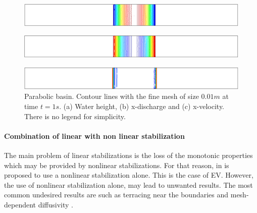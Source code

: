 \begin{figure}[H]
    \begin{subfigure}{.05\textwidth}
        \caption{}
    \end{subfigure}
    \begin{minipage}[c]{.94\textwidth}
        \includegraphics[width=\textwidth]{img/eulerian/par/height.png}
    \end{minipage}
\par\medskip
    \begin{subfigure}{.05\textwidth}
        \caption{}
    \end{subfigure}
    \begin{minipage}[c]{.94\textwidth}
        \includegraphics[width=\textwidth]{img/eulerian/par/momentum.png}
    \end{minipage}
\par\medskip
    \begin{subfigure}{.05\textwidth}
        \caption{}
    \end{subfigure}
    \begin{minipage}[c]{.94\textwidth}
        \includegraphics[width=\textwidth]{img/eulerian/par/velocity.png}
    \end{minipage}
\caption{Parabolic basin. Contour lines with the fine mesh of size $0.01m$ at time $t=1s$. (a) Water height, (b) x-discharge and (c) x-velocity. There is no legend for simplicity.}
\label{parabola_results}
\end{figure}





\paragraph{Combination of linear with non linear stabilization}


The main problem of linear stabilizations is the loss of the monotonic properties which may be provided by nonlinear stabilizations. For that reason, in \cite{guermond2011} is proposed to use a nonlinear stabilization alone. This is the case of EV.
However, the use of nonlinear stabilization alone, may lead to unwanted results. The most common undesired results are such as terracing near the boundaries \cite{lohner2008ch9,kuzmin2005b} and mesh-dependent diffusivity \cite{badia2014}.

